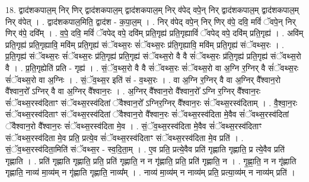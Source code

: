 \documentclass[17pt]{extarticle}
\begin{document}
18. द्वाद॑शकपाल॒म् निर् णिर् द्वाद॑शकपाल॒म् द्वाद॑शकपाल॒म् निर् व॑पेद् वपे॒न् निर् द्वाद॑शकपाल॒म् द्वाद॑शकपाल॒म् निर् व॑पेत् । . द्वाद॑शकपाल॒मिति॒ द्वाद॑श - क॒पा॒ल॒म् । . निर् व॑पेद् वपे॒न् निर् णिर् व॑पे॒ दवि॒ मविं॑ ॅवपे॒न् निर् णिर् व॑पे॒ दवि᳚म् । . व॒पे॒ दवि॒ मविं॑ ॅवपेद् वपे॒ दवि॑म् प्रति॒गृह्य॑ प्रति॒गृह्याविं॑ ॅवपेद् वपे॒ दवि॑म् प्रति॒गृह्य॑ । . अवि॑म् प्रति॒गृह्य॑ प्रति॒गृह्यावि॒ मवि॑म् प्रति॒गृह्य॑ संॅवथ्स॒रः सं॑ॅवथ्स॒रः प्र॑ति॒गृह्यावि॒ मवि॑म् प्रति॒गृह्य॑ संॅवथ्स॒रः । . प्र॒ति॒गृह्य॑ संॅवथ्स॒रः सं॑ॅवथ्स॒रः प्र॑ति॒गृह्य॑ प्रति॒गृह्य॑ संॅवथ्स॒रो वै वै सं॑ॅवथ्स॒रः प्र॑ति॒गृह्य॑ प्रति॒गृह्य॑ संॅवथ्स॒रो वै । . प्र॒ति॒गृह्येति॑ प्रति - गृह्य॑ । . सं॒ॅव॒थ्स॒रो वै वै सं॑ॅवथ्स॒रः सं॑ॅवथ्स॒रो वा अ॒ग्नि र॒ग्निर् वै सं॑ॅवथ्स॒रः सं॑ॅवथ्स॒रो वा अ॒ग्निः । . सं॒ॅव॒थ्स॒र इति॑ सं - व॒थ्स॒रः । . वा अ॒ग्नि र॒ग्निर् वै वा अ॒ग्निर् वै᳚श्वान॒रो वै᳚श्वान॒रो᳚ ऽग्निर् वै वा अ॒ग्निर् वै᳚श्वान॒रः । . अ॒ग्निर् वै᳚श्वान॒रो वै᳚श्वान॒रो᳚ ऽग्नि र॒ग्निर् वै᳚श्वान॒रः सं॑ॅवथ्स॒रस्व॑दिताꣳ संॅवथ्स॒रस्व॑दितां ॅवैश्वान॒रो᳚ ऽग्निर॒ग्निर् वै᳚श्वान॒रः सं॑ॅवथ्स॒रस्व॑दिताम् । . वै॒श्वा॒न॒रः सं॑ॅवथ्स॒रस्व॑दिताꣳ संॅवथ्स॒रस्व॑दितां ॅवैश्वान॒रो वै᳚श्वान॒रः सं॑ॅवथ्स॒रस्व॑दिता मे॒वैव सं॑ॅवथ्स॒रस्व॑दितां ॅवैश्वान॒रो वै᳚श्वान॒रः सं॑ॅवथ्स॒रस्व॑दिता मे॒व । . सं॒ॅव॒थ्स॒रस्व॑दिता मे॒वैव सं॑ॅवथ्स॒रस्व॑दिताꣳ संॅवथ्स॒रस्व॑दिता मे॒व प्रति॒ प्रत्ये॒व सं॑ॅवथ्स॒रस्व॑दिताꣳ संॅवथ्स॒रस्व॑दिता मे॒व प्रति॑ । . सं॒ॅव॒थ्स॒रस्व॑दिता॒मिति॑ संॅवथ्स॒र - स्व॒दि॒ता॒म् । . ए॒व प्रति॒ प्रत्ये॒वैव प्रति॑ गृह्णाति गृह्णाति॒ प्र त्ये॒वैव प्रति॑ गृह्णाति । . प्रति॑ गृह्णाति गृह्णाति॒ प्रति॒ प्रति॑ गृह्णाति॒ न न गृ॑ह्णाति॒ प्रति॒ प्रति॑ गृह्णाति॒ न । . गृ॒ह्णा॒ति॒ न न गृ॑ह्णाति गृह्णाति॒ नाव्य॑ मा॒व्य॑म् न गृ॑ह्णाति गृह्णाति॒ नाव्य᳚म् । . नाव्य॑ मा॒व्य॑म् न नाव्य॑म् प्रति॒ प्रत्या॒व्य॑म् न नाव्य॑म् प्रति॑ । \newline
\end{document}

